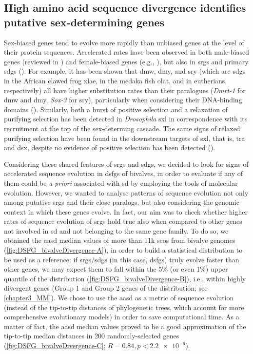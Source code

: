 \subsection{High amino acid sequence divergence identifies putative sex-determining genes}
Sex-biased genes tend to evolve more rapidly than unbiased genes at the level of their protein sequences. Accelerated rates have been observed in both male-biased genes (reviewed in \textbf{\cite{parsch2013evolutionary,grath2016sex}}) and female-biased genes (e.g., \textbf{\cite{papa2017anopheles, ghiselli2018comparative}}), but also in \glspl{srg} and primary \glspl{sdg} (\textbf{\cite{oNeil1992drosophila_tra, whitfield1993rapid, deBono1996caenorhabditis_tra}}). For example, it has been shown that \gls{dmw}, \gls{dmy}, and \gls{sry} (which are \glspl{sdg} in the African clawed frog \gls{xlae}, in the medaka fish \gls{olat}, and in eutherians, respectively) all have higher substitution rates than their paralogues (\textit{Dmrt-1} for \gls{dmw} and \gls{dmy}, \textit{Sox-3} for \gls{sry}), particularly when considering their DNA-binding domains (\textbf{\cite{mawaribuchi2012molecular}}). Similarly, both a burst of positive selection and a relaxation of purifying selection has been detected in \textit{Drosophila} \gls{sxl} in correspondence with its recruitment at the top of the sex-determing cascade. The same signs of relaxed purifying selection have been found in the downstream targets of \gls{sxl}, that is, \gls{tra} and \gls{dsx}, despite no evidence of positive selection has been detected (\textbf{\cite{mullon2012drosophila_sxl}}).

Considering these shared features of \glspl{srg} and \glspl{sdg}, we decided to look for signs of accelerated sequence evolution in \glspl{dsfg} of bivalves, in order to evaluate if any of them could be \textit{a-priori} associated with \gls{sd} by employing the tools of molecular evolution. However, we wanted to analyse patterns of sequence evolution not only among putative \glspl{srg} and their close paralogs, but also considering the genomic context in which these genes evolve. In fact, our aim was to check whether higher rates of sequence evolution of \glspl{srg} hold true also when compared to other genes not involved in \gls{sd} and not belonging to the same gene family. To do so, we obtained the \gls{aasd} median values of more than 11k \glspl{sco} from bivalve genomes (\cref{fig:DSFG_bivalveDivergence-A}), in order to build a statistical distribution to be used as a reference: if \glspl{srg}/\glspl{sdg} (in this case, \glspl{dsfg}) truly evolve faster than other genes, we may expect them to fall within the 5\% (or even 1\%) upper quantile of the distribution (\cref{fig:DSFG_bivalveDivergence-B}), i.e., within highly divergent genes (Group 1 and Group 2 genes of the distribution; see \cref{chapter3_MM}). We chose to use the \gls{aasd} as a metric of sequence evolution (instead of the tip-to-tip distances of phylogenetic trees, which account for more comprehensive evolutionary models) in order to save computational time. As a matter of fact, the \gls{aasd} median values proved to be a good approximation of the tip-to-tip median distances in 200 randomly-selected genes (\cref{fig:DSFG_bivalveDivergence-C}; $R = 0.84, p < \num{2.2e-6}$).

